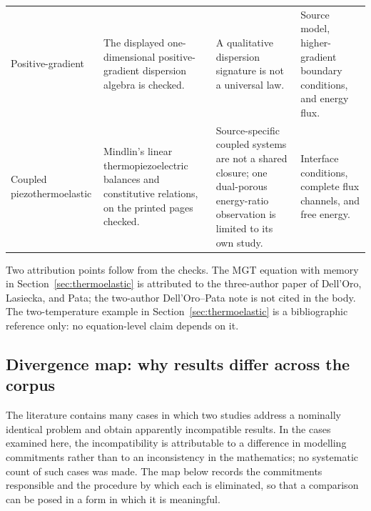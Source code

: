 \begin{longtable}{@{}>{\raggedright\arraybackslash}p{2.6cm}>{\raggedright\arraybackslash}p{3.9cm}>{\raggedright\arraybackslash}p{3.9cm}>{\raggedright\arraybackslash}p{3.9cm}@{}}
Positive-gradient & The displayed one-dimensional positive-gradient dispersion algebra is checked. & A qualitative dispersion signature is not a universal law. & Source model, higher-gradient boundary conditions, and energy flux. \\
Coupled piezothermoelastic & Mindlin's linear thermopiezoelectric balances and constitutive relations, on the printed pages checked. & Source-specific coupled systems are not a shared closure; one dual-porous energy-ratio observation is limited to its own study. & Interface conditions, complete flux channels, and free energy. \\
\end{longtable}

Two attribution points follow from the checks. The MGT equation with memory in Section~\ref{sec:thermoelastic} is attributed to the three-author paper of Dell'Oro, Lasiecka, and Pata; the two-author Dell'Oro--Pata note is not cited in the body. The two-temperature example in Section~\ref{sec:thermoelastic} is a bibliographic reference only: no equation-level claim depends on it.

\subsection{Divergence map: why results differ across the corpus}
\label{sec:12.4}

The literature contains many cases in which two studies address a nominally identical problem and obtain apparently incompatible results. In the cases examined here, the incompatibility is attributable to a difference in modelling commitments rather than to an inconsistency in the mathematics; no systematic count of such cases was made. The map below records the commitments responsible and the procedure by which each is eliminated, so that a comparison can be posed in a form in which it is meaningful.

